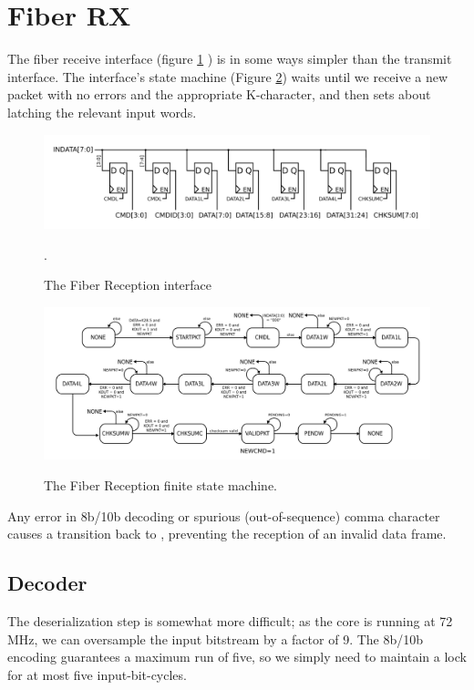 \section{Fiber RX}

The fiber receive interface (figure \ref{fiberrx} ) is in some ways
simpler than the transmit interface. The interface's state machine
(Figure \ref{fiberrxfsm}) waits until we receive a new packet with no
errors and the appropriate K-character, and then sets about latching
the relevant input words.

\begin{figure}[h!]
\includegraphics[scale=1.0]{fiberRX.svg}
\label{fiberrx}
\caption{The Fiber Reception interface}. 
\end{figure}

\begin{figure}[h!]
\includegraphics[scale=1.0]{fiberRX.fsm.svg}
\label{fiberrxfsm}
\caption{The Fiber Reception finite state machine.}
\end{figure}


Any error in 8b/10b decoding or spurious (out-of-sequence) comma
character causes a transition back to , preventing the
reception of an invalid data frame.


\subsection{Decoder}

The deserialization step is somewhat more difficult; as the core is
running at 72 MHz, we can oversample the input bitstream by a factor
of 9. The 8b/10b encoding guarantees a maximum run of five, so we
simply need to maintain a lock for at most five input-bit-cycles.

